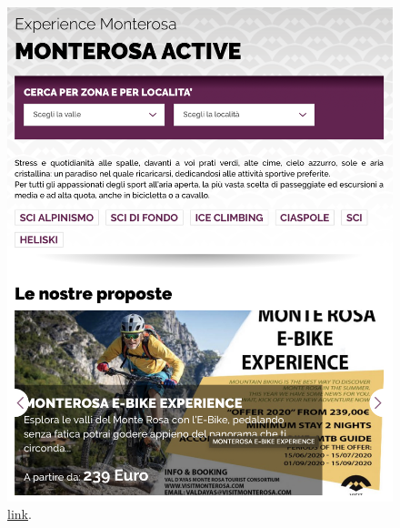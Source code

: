 \documentclass[a4paper, 11pt, parskip=half, headsepline]{scrreprt}
\begin{document}
\begin{figure}[H]
    \begin{minipage}[t]{0.5\textwidth}
        \centering
        \includegraphics[width=1\linewidth, keepaspectratio]{11-interaction-consistency}
        \caption{\href{https://www.visitmonterosa.com/experience-monterosa/monterosa-active/}{link}.}
        \label{fig:interaction-consistency-01}
    \end{minipage}   
    \hspace*{\fill}
    \begin{minipage}[t]{0.5\textwidth}
        \centering

\end{minipage}
\end{figure}
\end{document}
